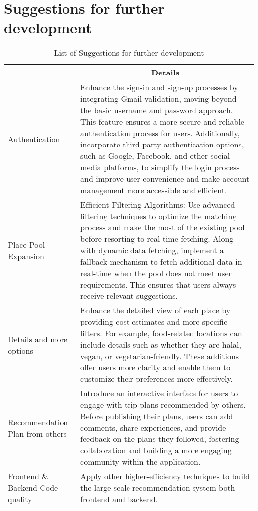 \section{Suggestions for further development}
\newpage
\begin{table}[]
    \centering
    \renewcommand{\arraystretch}{1.2}
    \begin{tabular}{|p{2.2in}|p{4in}|}
    \hline
    \rowcolor[HTML]{C0C0C0} 
    \multicolumn{1}{|c|}{\cellcolor[HTML]{C0C0C0}\textbf{Suggestion}}                                                                                       & \multicolumn{1}{c|}{\cellcolor[HTML]{C0C0C0}\textbf{Details}}   \\ \hline
    Authentication & Enhance the sign-in and sign-up processes by integrating Gmail validation, moving beyond the basic username and password approach. This feature ensures a more secure and reliable authentication process for users. Additionally, incorporate third-party authentication options, such as Google, Facebook, and other social media platforms, to simplify the login process and improve user convenience and make account management more accessible and efficient. \\ \hline
    Place Pool Expansion & Efficient Filtering Algorithms: Use advanced filtering techniques to optimize the matching process and make the most of the existing pool before resorting to real-time fetching. Along with dynamic data fetching, implement a fallback mechanism to fetch additional data in real-time when the pool does not meet user requirements. This ensures that users always receive relevant suggestions. \\ \hline
    Details and more options & Enhance the detailed view of each place by providing cost estimates and more specific filters. For example, food-related locations can include details such as whether they are halal, vegan, or vegetarian-friendly. These additions offer users more clarity and enable them to customize their preferences more effectively. \\ \hline
    Recommendation Plan from others & Introduce an interactive interface for users to engage with trip plans recommended by others. Before publishing their plans, users can add comments, share experiences, and provide feedback on the plans they followed, fostering collaboration and building a more engaging community within the application. \\ \hline
    Frontend \& Backend Code quality & Apply other higher-efficiency techniques to build the large-scale recommendation system both frontend and backend. \\ \hline
    \end{tabular}
    \caption{List of Suggestions for further development}
    \label{tab:suggestion-table}
\end{table}


